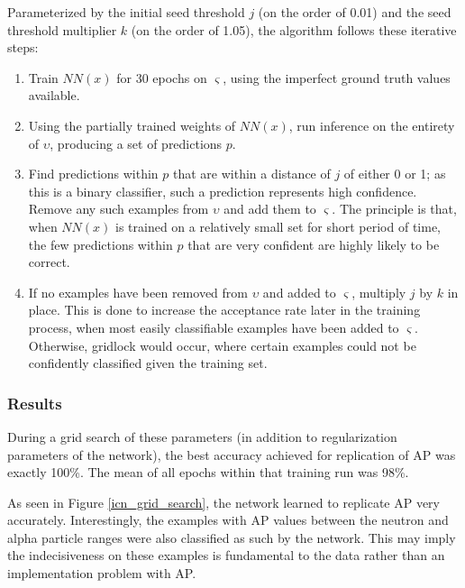 \documentclass[10pt]{article}
\begin{document}
Parameterized by the initial seed threshold $j$ (on the order of 0.01) and the seed threshold multiplier $k$ (on the order of 1.05), the algorithm follows these iterative steps:

\begin{enumerate}
    \item Train $NN(x)$ for 30 epochs on $\varsigma$, using the imperfect ground truth values available.
    \item Using the partially trained weights of $NN(x)$, run inference on the entirety of $\upsilon$, producing a set of predictions $p$.
    \item Find predictions within $p$ that are within a distance of $j$ of either 0 or 1; as this is a binary classifier, such a prediction represents high confidence. Remove any such examples from $\upsilon$ and add them to $\varsigma$. The principle is that, when $NN(x)$ is trained on a relatively small set for short period of time, the few predictions within $p$ that are very confident are highly likely to be correct.
    \item If no examples have been removed from $\upsilon$ and added to $\varsigma$, multiply $j$ by $k$ in place. This is done to increase the acceptance rate later in the training process, when most easily classifiable examples have been added to $\varsigma$. Otherwise, gridlock would occur, where certain examples could not be confidently classified given the training set.
\end{enumerate}

\subsubsection{Results}

During a grid search of these parameters (in addition to regularization parameters of the network), the best accuracy achieved for replication of AP was exactly 100\%. The mean of all epochs within that training run was 98\%.

As seen in Figure \ref{icn_grid_search}, the network learned to replicate AP very accurately. Interestingly, the examples with AP values between the neutron and alpha particle ranges were also classified as such by the network. This may imply the indecisiveness on these examples is fundamental to the data rather than an implementation problem with AP.
\end{document}
